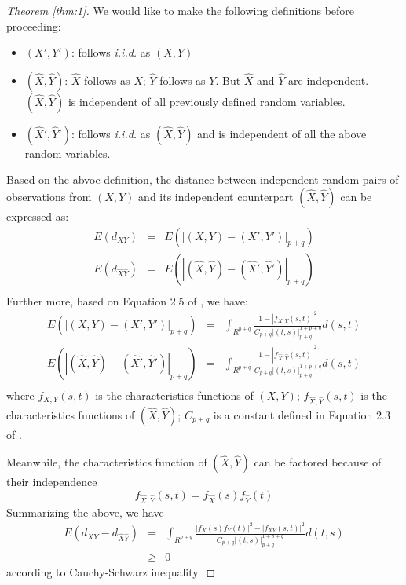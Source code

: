 \documentclass{sig-alternate}
\begin{document}
\begin{proof}[Theorem \ref{thm:1}]
  We would like to make the following definitions before proceeding:
  \begin{itemize}
  \item $(X', Y')$: follows \emph{i.i.d.} as $(X,Y)$
  \item $(\hat{X},\hat{Y})$: $\hat{X}$ follows \iid{} as $X$;
    $\hat{Y}$ follows \iid{} as $Y$. But $\hat{X}$ and $\hat{Y}$ are
    independent. $(\hat{X},\hat{Y})$ is independent of all previously
    defined random variables.
  \item $(\hat{X}', \hat{Y}')$: follows \emph{i.i.d.} as
    $(\hat{X},\hat{Y})$ and is independent of all the above random
    variables.
  \end{itemize}
  Based on the abvoe definition, the distance between independent
  random pairs of observations from $(X,Y)$ and its independent
  counterpart $(\hat{X}, \hat{Y})$ can be expressed as: 
  \begin{eqnarray*}
    E(d_{XY}) & = & E(|(X,Y) - (X', Y')|_{p+q})\\
    E(d_{\hat{X}\hat{Y}}) & = & E(|(\hat{X},\hat{Y}) - (\hat{X}', \hat{Y}')|_{p+q})\\
  \end{eqnarray*}
  Further more, based on Equation 2.5 of \cite{székely2007}, we have:
  \begin{eqnarray*}
    E(|(X,Y) - (X',Y')|_{p+q}) &=& \int_{R^{p+q}}
    \frac{1-|f_{X,Y}(s,t)|^2}{C_{p+q}|(t,s)|_{p+q}^{1+p+q}} d(s,t)\\
    E(|(\hat{X},\hat{Y}) - (\hat{X}',\hat{Y}')|_{p+q}) &=& \int_{R^{p+q}}
    \frac{1-|f_{\hat{X},\hat{Y}}(s,t)|^2}{C_{p+q}|(t,s)|_{p+q}^{1+p+q}} d(s,t)\\
  \end{eqnarray*}
  where $f_{X,Y}(s,t)$ is the characteristics functions of $(X,Y)$;
  $f_{\hat{X},\hat{Y}}(s,t)$ is the characteristics functions of
  $(\hat{X},\hat{Y})$; $C_{p+q}$ is a constant defined in Equation 2.3
  of \cite{székely2007}.

  Meanwhile, the characteristics function of $(\hat{X}, \hat{Y})$ can
  be factored because of their independence
  \begin{displaymath}
    f_{\hat{X},\hat{Y}}(s,t) = f_{\hat{X}}(s) f_{\hat{Y}}(t) 
  \end{displaymath}
  Summarizing the above, we have 
  \begin{eqnarray*}
    E(d_{XY} - d_{\hat{X}\hat{Y}})& =& \int_{R^{p+q}} \frac{|f_X(s)
      f_Y(t)|^2 - |f_{XY}(s,t)|^2}{C_{p+q}|(t,s)|_{p+q}^{1+p+q}}
    d(t,s)\\
    &\ge & 0 
  \end{eqnarray*}
  according to Cauchy-Schwarz inequality. 
\end{proof}




\end{document}
